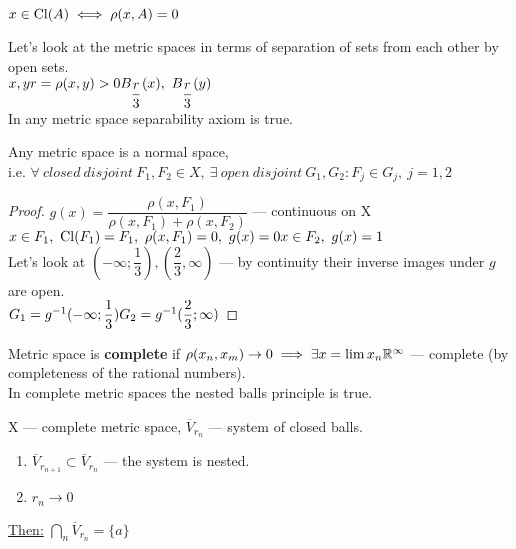 \begin{stm}
  $x \in \operatorname{Cl}({A}) \iff \rho(x, A) = 0$
\end{stm}

Let's look at the metric spaces in terms of separation of sets from each other by open sets. \\
$x, y \\
r = \rho(x, y) > 0 \\
B_{\dfrac{r}{3}}(x),\ B_{\dfrac{r}{3}}(y)$ \\
In any metric space separability axiom is true.

\begin{thm}
  Any metric space is a normal space, \\i.e.
  $\forall\ closed\ disjoint\ F_1, F_2 \in X,\ \exists\ open\ disjoint\ G_1, G_2\colon F_j \in G_j,\ j = 1, 2$
\end{thm}

\begin{proof}
  $g(x) = \dfrac{\rho(x, F_1)}{\rho(x, F_1) + \rho(x, F_2)}$ --- continuous on X \\
  $x \in F_1,\ \operatorname{Cl}({F_1}) = F_1,\ \rho(x, F_1) = 0,\ g(x) = 0 \\
  x \in F_2,\ g(x) = 1$ \\
  Let's look at $(-\infty; \dfrac{1}{3}), (\dfrac{2}{3}, \infty)$ --- by continuity their inverse images under $g$ are open. \\
  $G_1 = g^{-1}(-\infty; \dfrac{1}{3}) \\
  G_2 = g^{-1}(\dfrac{2}{3}; \infty)$
\end{proof}

\begin{defn}
  Metric space is \textbf{complete} if $\rho(x_n, x_m) \to 0 \implies \exists x = \lim x_n \\
  \mathbb{R}^\infty$ --- complete (by completeness of the rational numbers). \\
  In complete metric spaces the nested balls principle is true.
\end{defn}

\begin{thm}
  X --- complete metric space, $\overline{V}_{r_n}$ --- system of closed balls.
  \begin{enumerate}
      \item $\overline{V}_{r_{n + 1}} \subset \overline{V}_{r_n}$ --- the system is nested.
      \item $r_n \to 0$
    \end{enumerate}
  \underline{Then:} $\bigcap\limits_n \overline{V}_{r_n} = \{a\}$
\end{thm}


